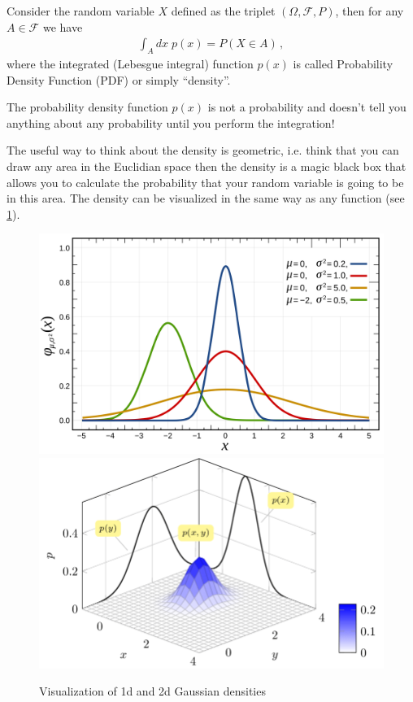 \begin{mybox}
\begin{definition}\label{def:pdf}
    Consider the random variable $X$ defined as the triplet $(\Omega, \mathcal{F}, P)$, then for any $A \in \mathcal{F}$ we have
    \begin{align}
        \int_{A} dx\; p(x) = P(X \in A)\,,
    \end{align}
    where the integrated (Lebesgue integral) function $p(x)$ is called Probability Density Function (PDF) or simply ``density''.
\end{definition}
\end{mybox}

The probability density function $p(x)$ is not a probability and doesn't tell you anything about any probability until you perform the integration! 

The useful way to think about the density is geometric, i.e. think that you can draw any area in the Euclidian space  then the density is a magic black box that allows you to calculate the probability that your random variable is going to be in this area.
The density can be visualized in the same way as any function (see \cref{fig:densities_visualization}).

\begin{figure}[t]
    \centering
    \includegraphics[width=0.45\linewidth]{pics/1d_density.png}
    \includegraphics[width=0.45\linewidth]{pics/2d_density.png}
    \caption{Visualization of 1d and 2d Gaussian densities}
    \label{fig:densities_visualization}
\end{figure}

